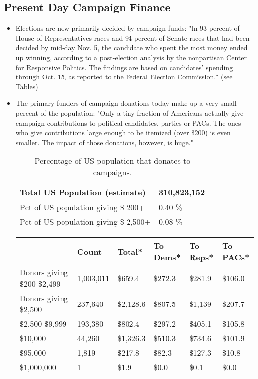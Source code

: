 \documentclass[11pt]{article} %
\begin{document}
\subsection{Present Day Campaign Finance}



\begin{itemize}

\item Elections are now primarily decided by campaign funds: "In 93 percent of House of Representatives races and 94 percent of Senate races that had been decided by mid-day Nov. 5, the candidate who spent the most money ended up winning, according to a post-election analysis by the nonpartisan Center for Responsive Politics. The findings are based on candidates' spending through Oct. 15, as reported to the Federal Election Commission." (see Tables) ~\cite{OpenSecretsWins}

\item The primary funders of campaign donations today make up a very small percent of the population: "Only a tiny fraction of Americans actually give campaign contributions to political candidates, parties or PACs. The ones who give contributions large enough to be itemized (over \$200) is even smaller. The impact of those donations, however, is huge."~\cite{OpenSecretsDemographics13}  


\begin{table}
    \begin{tabular}{|l|l|}
        \hline
        Total US Population (estimate)     & 310,823,152 \\ \hline
        Pct of US population giving \$ 200+   & 0.40 \%     \\ 
        Pct of US population giving \$ 2,500+ &  0.08   \%   \\
        \hline
    \end{tabular}
 \caption{Percentage of US population that donates to campaigns. }
\end{table}

\begin{table}
    \begin{tabular}{|l|l|l|l|l|l|}
        \hline
        ~                           & Count      & Total*     & To Dems* & To Reps* & To PACs* \\ \hline
        Donors giving \$200-\$2,499 & 1,003,011	 & \$659.4   & \$272.3 & \$281.9 & \$106.0 \\ 
        Donors giving \$2,500+      & 237,640    & \$2,128.6 & \$807.5 & \$1,139 & \$207.7 \\ 
             \$2,500-\$9,999        & 193,380    & \$802.4   & \$297.2 & \$405.1 & \$105.8 \\ 
              \$10,000+             & 44,260     & \$1,326.3 & \$510.3 & \$734.6 & \$101.9 \\ 
        \$95,000                    & 1,819      & \$217.8   & \$82.3  & \$127.3 & \$10.8  \\ 
        \$1,000,000                 & 1          & \$1.9     & \$0.0   & \$0.1   & \$0.0   \\ 
   

\end{tabular}
\end{table}
\end{itemize}
\end{document}

